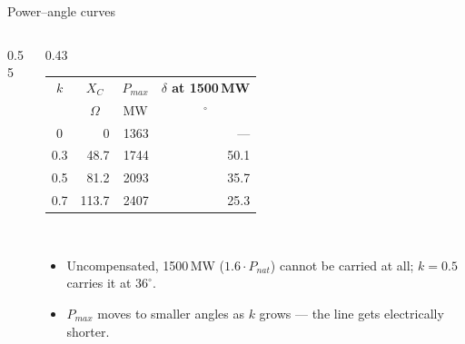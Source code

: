 \begin{frame}{Power--angle curves}
  \begin{columns}[c,onlytextwidth]
    \begin{column}{0.55\textwidth}\centering
    \end{column}
    \begin{column}{0.43\textwidth}
      \renewcommand{\arraystretch}{1.15}
      {\footnotesize
      \begin{tabular}{@{}c r r r@{}}
        \textbf{$k$} & \multicolumn{1}{c}{\textbf{$X_C$}}
                     & \multicolumn{1}{c}{\textbf{$P_{max}$}}
                     & \multicolumn{1}{c}{\textbf{$\delta$ at 1500\,MW}} \\
                     & \multicolumn{1}{c}{$\Omega$} & \multicolumn{1}{c}{MW}
                     & \multicolumn{1}{c}{$^\circ$} \\
        \hline
        0   & 0     & 1363 & --- \\
        0.3 & 48.7  & 1744 & 50.1 \\
        0.5 & 81.2  & 2093 & 35.7 \\
        0.7 & 113.7 & 2407 & 25.3 \\
        \hline
      \end{tabular}}\\[0.45em]
      {\small
      \begin{itemize}
        \setlength{\itemsep}{0.3em}
        \item Uncompensated, 1500\,MW ($1.6\cdot P_{nat}$) cannot be carried
              at all; $k=0.5$ carries it at $36^\circ$.
        \item $P_{max}$ moves to smaller angles as $k$ grows --- the line gets
              electrically shorter.
      \end{itemize}}
    \end{column}
  \end{columns}
\end{frame}

